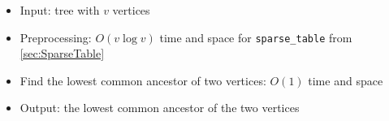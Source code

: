 \begin{itemize}
	\item Input: tree with $v$ vertices
	\item Preprocessing: $O(v\log{v})$ time and space for \lstinline{sparse_table} from \ref{sec:SparseTable}
	\item Find the lowest common ancestor of two vertices: $O(1)$ time and space
	\item Output: the lowest common ancestor of the two vertices
\end{itemize}
